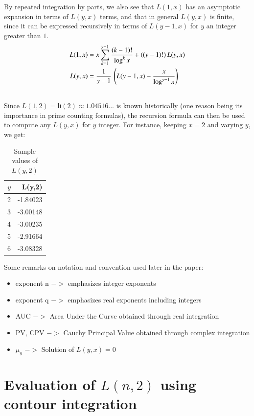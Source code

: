 \documentclass[a4paper,11pt,twoside]{amsart}
\newcommand\li{\mathrm{li}}
\begin{document}
By repeated integration by parts, we also see that $L(1,x)$ has an asymptotic expansion in terms of $L(y,x)$ terms, and that in general $L(y,x)$ is finite, since it can be expressed recursively in terms of $L(y-1,x)$ for $y$ an integer greater than $1$.
\begin{align}
L(1,x) &= x\sum\limits_{k=1}^{y-1} \frac{(k-1)!}{\log^{k} x} + ((y-1)!)\,L(y,x)  \\
L(y,x) &= \frac{1}{y-1} \, \left(L(y-1,x) - \frac{x}{\log^{y-1} x}\right) \\
\notag
\end{align}
Since $L(1,2) = \li(2) \approx 1.04516...$ \cite{weis} is known historically (one reason being its importance in prime counting formulas), the recursion formula can then be used to compute any $L(y,x)$ for $y$ integer. For instance, keeping $x=2$ and varying $y$, we get:
\begin{table}[H]
  \begin{tabular}{r|r} %
      $y$ & L(y,2)\\
      \hline
      2 & -1.84023\\
      3 & -3.00148\\
      4 & -3.00235\\
      5 & -2.91664\\
      6 & -3.08328\\
  \end{tabular}
  \caption{Sample values of $L(y,2)$}
\end{table}
\vspace{-2em}

\pagebreak
Some remarks on notation and convention used later in the paper:
\begin{itemize}
 \item exponent n $->$ emphasizes integer exponents
 \item exponent q $->$ emphasizes real exponents including integers
 \item AUC $->$ Area Under the Curve obtained through real integration
 \item PV, CPV $->$ Cauchy Principal Value obtained through complex integration 
 \item $\mu_y$ $->$ Solution of $L(y,x)=0$
\end{itemize}

\section{Evaluation of $L(n,2)$ using contour integration}
\end{document}
